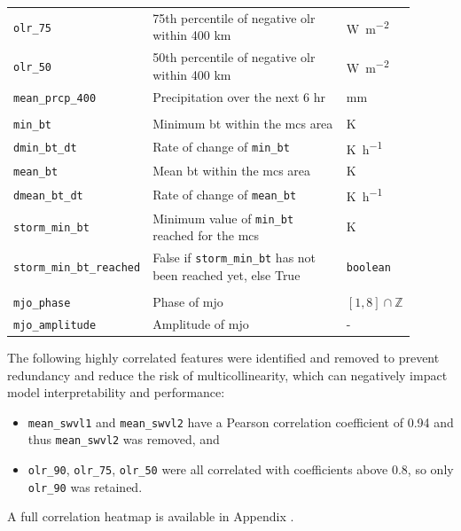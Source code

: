 {\begin{longtable}{>{\raggedright\arraybackslash}p{0.25\linewidth} p{0.50\linewidth} >{\raggedright\arraybackslash}p{0.15\linewidth}}
    \texttt{olr\_75} & 75th percentile of negative \acrshort{olr} within 400 km & \unit{\watt\per\square\meter} \\
    \texttt{olr\_50} & 50th percentile of negative \acrshort{olr} within 400 km & \unit{\watt\per\square\meter} \\
    \texttt{mean\_prcp\_400} & Precipitation over the next 6 hr & \unit{\milli\meter} \\
    \midrule
    \multicolumn{3}{c}{\textit{Storm intensity features}} \\
    \midrule
    \texttt{min\_bt} & Minimum \acrfull{bt} within the \acrshort{mcs} area & \unit{\kelvin} \\
    \texttt{dmin\_bt\_dt} & Rate of change of \texttt{min\_bt} & \unit{\kelvin\per\hour} \\
    \texttt{mean\_bt} & Mean \acrshort{bt} within the \acrshort{mcs} area & \unit{\kelvin} \\
    \texttt{dmean\_bt\_dt} & Rate of change of \texttt{mean\_bt} & \unit{\kelvin\per\hour} \\
    \texttt{storm\_min\_bt} & Minimum value of \texttt{min\_bt} reached for the \acrshort{mcs} & \unit{\kelvin} \\
    \texttt{storm\_min\_bt\_reached} & False if \texttt{storm\_min\_bt} has not been reached yet, else True & \texttt{boolean} \\
    \midrule
    \multicolumn{3}{c}{\textit{Other features}} \\
    \midrule
    \texttt{mjo\_phase} & Phase of \acrfull{mjo} & $[1, 8] \cap \mathbb{Z}$ \\
    \texttt{mjo\_amplitude} & Amplitude of \acrshort{mjo} & - \\
\end{longtable}
}

The following highly correlated features were identified and removed to prevent redundancy and reduce the risk of multicollinearity, which can negatively impact model interpretability and performance: 
\begin{itemize}
    \item \texttt{mean\_swvl1} and \texttt{mean\_swvl2} have a Pearson correlation coefficient of 0.94 and thus \texttt{mean\_swvl2} was removed, and
    \item \texttt{olr\_90}, \texttt{olr\_75}, \texttt{olr\_50} were all correlated with coefficients above 0.8, so only \texttt{olr\_90} was retained.
\end{itemize}
A full correlation heatmap is available in Appendix . 

